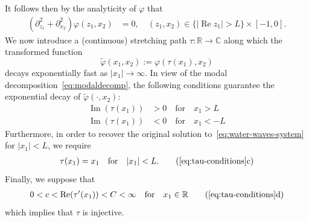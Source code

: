 \documentclass[review,hidelinks,onefignum,onetabnum]{siamart220329}
\newcommand{\R}{\mathbb{R}}
\newcommand{\C}{\mathbb{C}}
\newcommand{\tvarphi}{\widetilde \varphi}
\newcommand{\real}{\operatorname{Re}}
\newcommand{\imag}{\operatorname{Im}}
\begin{document}
It follows then  by the analyticity of $\varphi$ that
\begin{align}  
  \label{eq:pml-laplace-equation}
  \left( \partial_{z_1}^2 + \partial_{x_2}^2 \right) \varphi(z_1,x_2) &=0, \quad (z_1,x_2) \in \{|\real z_1 | > L \} \times [-1,0].
\end{align}
We now introduce a (continuous) stretching path $\tau : \R \to \C$ along which the transformed function 
\begin{equation}\label{eq:transf_eq}
\tvarphi(x_1,x_2) := \varphi(\tau(x_1),x_2)    
\end{equation} decays exponentially fast as $|x_1| \to \infty$. In view of the modal decomposition~\cref{eq:modaldecomp}, the following conditions guarantee the exponential decay of $\tvarphi(\cdot,x_2)$:
\begin{subequations}
\label{eq:tau-conditions}
\begin{align}
    \imag\left(\tau(x_1)\right) &> 0 \quad \mbox{for} \quad x_1 > L\\
    \imag\left(\tau(x_1)\right) &< 0 \quad \mbox{for} \quad x_1 < -L
\end{align}        
\end{subequations}
Furthermore, in order to recover the original solution to~\cref{eq:water-waves-system} for $|x_1| < L$, we require
\begin{subequations}
    \begin{align}
        \tau(x_1) = x_1 \quad \mbox{for} \quad |x_1|<L. \tag{\ref{eq:tau-conditions}c}
        \label{eq:tau-condition-identity}
    \end{align}
\end{subequations}
Finally, we suppose that
\begin{subequations}
\begin{align}
    0 < c < \real(\tau'(x_1)) < C < \infty \quad \mbox{for} \quad x_1 \in \R \tag{\ref{eq:tau-conditions}d}
    \label{eq:tau-condition-real}
\end{align}
\end{subequations}
which implies that $\tau$ is injective. 
\end{document}
